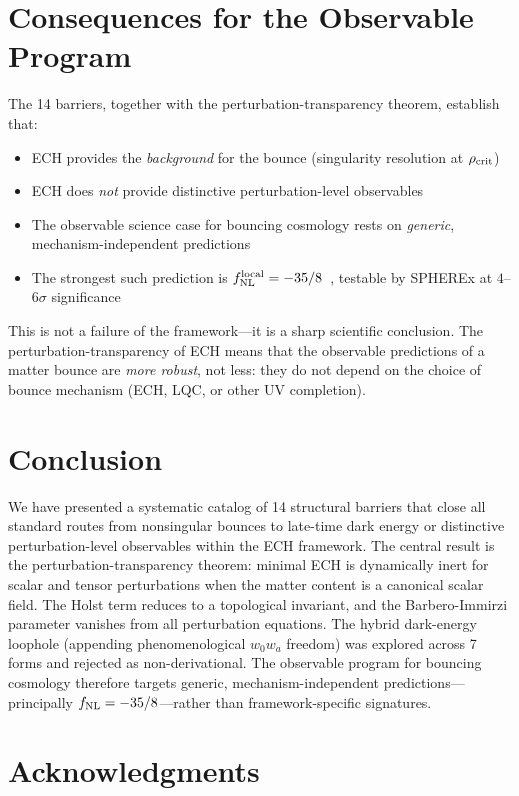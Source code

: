 \documentclass[a4paper,11pt]{article}
\newcommand{\fnl}{f_{\rm NL}}
\begin{document}
\section{Consequences for the Observable Program}

The 14 barriers, together with the perturbation-transparency theorem, establish that:

\begin{itemize}
\item ECH provides the \emph{background} for the bounce (singularity resolution at $\rho_{\rm crit}$)
\item ECH does \emph{not} provide distinctive perturbation-level observables
\item The observable science case for bouncing cosmology rests on \emph{generic}, mechanism-independent predictions
\item The strongest such prediction is $\fnl^{\rm local} = -35/8$~\citep{Cai:2009fn}, testable by SPHEREx at $4$--$6\sigma$ significance~\citep{Heinrich:2023}
\end{itemize}

This is not a failure of the framework---it is a sharp scientific conclusion. The perturbation-transparency of ECH means that the observable predictions of a matter bounce are \emph{more robust}, not less: they do not depend on the choice of bounce mechanism (ECH, LQC, or other UV completion).

\section{Conclusion}

We have presented a systematic catalog of 14 structural barriers that close all standard routes from nonsingular bounces to late-time dark energy or distinctive perturbation-level observables within the ECH framework. The central result is the perturbation-transparency theorem: minimal ECH is dynamically inert for scalar and tensor perturbations when the matter content is a canonical scalar field. The Holst term reduces to a topological invariant, and the Barbero-Immirzi parameter vanishes from all perturbation equations. The hybrid dark-energy loophole (appending phenomenological $w_0w_a$ freedom) was explored across 7 forms and rejected as non-derivational. The observable program for bouncing cosmology therefore targets generic, mechanism-independent predictions---principally $\fnl = -35/8$---rather than framework-specific signatures.

\section*{Acknowledgments}
\end{document}
